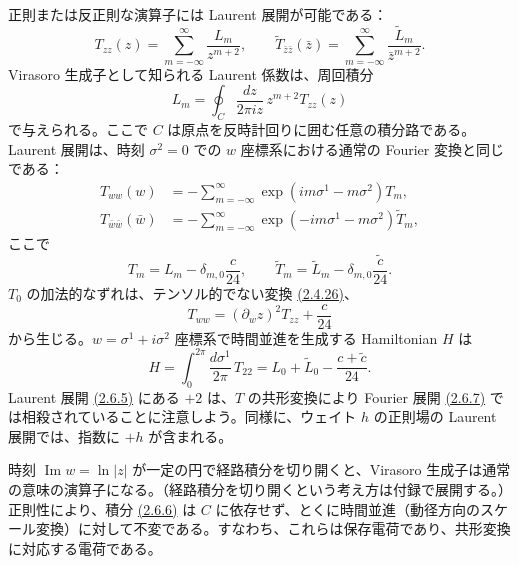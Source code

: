 正則または反正則な演算子には Laurent 展開が可能である：
\begin{equation}
T_{zz}(z)=\sum_{m=-\infty}^{\infty}\frac{L_m}{z^{m+2}},
\qquad
\widetilde T_{\bar z\bar z}(\bar z)
=\sum_{m=-\infty}^{\infty}\frac{\widetilde L_m}{\bar z^{m+2}}.
\tag{2.6.5}\label{eq:2.6.5}
\end{equation}
Virasoro 生成子として知られる Laurent 係数は、周回積分
\begin{equation}
L_m=\oint_C\frac{dz}{2\pi iz}\,z^{m+2}T_{zz}(z)
\tag{2.6.6}\label{eq:2.6.6}
\end{equation}
で与えられる。ここで $C$ は原点を反時計回りに囲む任意の積分路である。Laurent 展開は、時刻 $\sigma^2=0$ での $w$ 座標系における通常の Fourier 変換と同じである：
\begin{align}
T_{ww}(w)&=-\sum_{m=-\infty}^{\infty}
\exp(im\sigma^1-m\sigma^2)T_m,
\tag{2.6.7a}\label{eq:2.6.7a}\\
T_{\bar w\bar w}(\bar w)&=-\sum_{m=-\infty}^{\infty}
\exp(-im\sigma^1-m\sigma^2)\widetilde T_m,
\tag{2.6.7b}\label{eq:2.6.7b}
\end{align}
ここで
\begin{equation}
T_m=L_m-\delta_{m,0}\frac c{24},\qquad
\widetilde T_m=\widetilde L_m-\delta_{m,0}\frac{\widetilde c}{24}.
\tag{2.6.8}\label{eq:2.6.8}
\end{equation}
$T_0$ の加法的なずれは、テンソル的でない変換 \hyperref[eq:2.4.26]{(2.4.26)}、
\begin{equation}
T_{ww}=(\partial_w z)^2T_{zz}+\frac c{24}
\tag{2.6.9}\label{eq:2.6.9}
\end{equation}
から生じる。$w=\sigma^1+i\sigma^2$ 座標系で時間並進を生成する Hamiltonian $H$ は
\begin{equation}
H=\int_0^{2\pi}\frac{d\sigma^1}{2\pi}\,T_{22}
=L_0+\widetilde L_0-\frac{c+\widetilde c}{24}.
\tag{2.6.10}\label{eq:2.6.10}
\end{equation}
Laurent 展開 \hyperref[eq:2.6.5]{(2.6.5)} にある $+2$ は、$T$ の共形変換により Fourier 展開 \hyperref[eq:2.6.7a]{(2.6.7)} では相殺されていることに注意しよう。同様に、ウェイト $h$ の正則場の Laurent 展開では、指数に $+h$ が含まれる。

時刻 $\operatorname{Im}w=\ln|z|$ が一定の円で経路積分を切り開くと、Virasoro 生成子は通常の意味の演算子になる。（経路積分を切り開くという考え方は付録で展開する。）正則性により、積分 \hyperref[eq:2.6.6]{(2.6.6)} は $C$ に依存せず、とくに時間並進（動径方向のスケール変換）に対して不変である。すなわち、これらは保存電荷であり、共形変換に対応する電荷である。

